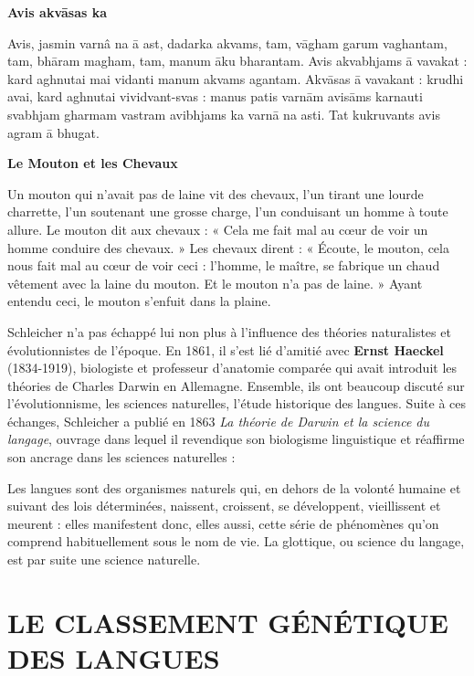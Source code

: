 \begin{lecture}{}
\textbf{Avis akvāsas ka}\par
Avis, jasmin varnâ na ā ast, dadarka akvams, tam, vāgham garum vaghantam, tam, bhāram magham, tam, manum āku bharantam. Avis akvabhjams ā vavakat : kard aghnutai mai vidanti manum akvams agantam. Akvāsas ā vavakant : krudhi avai, kard aghnutai vividvant-svas : manus patis varnām avisāms karnauti svabhjam gharmam vastram avibhjams ka varnā na asti. Tat kukruvants avis agram ā bhugat.

\textbf{Le Mouton et les Chevaux}\par
Un mouton qui n’avait pas de laine vit des chevaux, l’un tirant une lourde charrette, l’un soutenant une grosse charge, l’un conduisant un homme à toute allure. Le mouton dit aux chevaux : « Cela me fait mal au cœur de voir un homme conduire des chevaux. » Les chevaux dirent : « Écoute, le mouton, cela nous fait mal au cœur de voir ceci : l’homme, le maître, se fabrique un chaud vêtement avec la laine du mouton. Et le mouton n’a pas de laine. » Ayant entendu ceci, le mouton s’enfuit dans la plaine.
\end{lecture}

Schleicher n’a pas échappé lui non plus à l’influence des théories naturalistes et évolutionnistes de l’époque. En 1861, il s’est lié d’amitié avec \textbf{Ernst Haeckel} (1834-1919), biologiste et professeur d’anatomie comparée qui avait introduit les théories de Charles Darwin en Allemagne. Ensemble, ils ont beaucoup discuté sur l’évolutionnisme, les sciences naturelles, l’étude historique des langues. Suite à ces échanges, Schleicher a publié en 1863 \textit{La théorie de Darwin et la science du langage}, ouvrage dans lequel il revendique son biologisme linguistique et réaffirme son ancrage dans les sciences naturelles :
\begin{lecture}{}
Les langues sont des organismes naturels qui, en dehors de la volonté humaine et suivant des lois déterminées, naissent, croissent, se développent, vieillissent et meurent : elles manifestent donc, elles aussi, cette série de phénomènes qu’on comprend habituellement sous le nom de vie. La glottique, ou science du langage, est par suite une science naturelle.
\end{lecture}

\section{LE CLASSEMENT GÉNÉTIQUE DES LANGUES}
